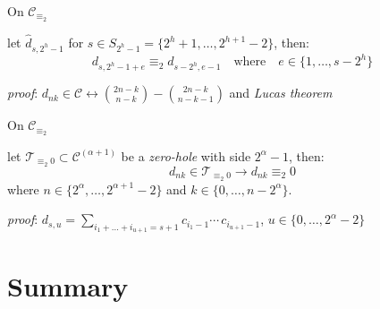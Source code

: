 \documentclass[10pt,serif, professionalfont]{beamer}
\begin{document}
\begin{frame}{On $\mathcal{C}_{\equiv_{2}}$}
    \begin{theorem}
    let $\hat{d}_{s,2^{h}-1}$ for $s\in S_{2^{h}-1}=\lbrace 2^{h}+1,\ldots,2^{h+1}-2 \rbrace$, then:
    \begin{displaymath}
        d_{s,2^{h}-1+e} \equiv_{2} d_{s-2^{h},e-1}\quad\text{where}\quad e\in\lbrace1,\ldots,s-2^{h}\rbrace
    \end{displaymath}
    \end{theorem}
    \emph{proof}: $ d_{nk}\in\mathcal{C}\leftrightarrow{{2n-k}\choose{n-k}} - {{2n-k}\choose{n-k-1}}$ and \emph{Lucas theorem}

    
        
\end{frame}

\begin{frame}{On $\mathcal{C}_{\equiv_{2}}$}
    \begin{theorem}
    let $\mathcal{T}_{\equiv_{2}0} \subset \mathcal{C}^{(\alpha+1)}$ be a %
    \emph{zero-hole} with side $2^{\alpha}-1$, then:
    \begin{displaymath}
        d_{nk}\in\mathcal{T}_{\equiv_{2}0}\rightarrow d_{nk}\equiv_{2}0
    \end{displaymath}
    where $n\in\lbrace2^{\alpha},\ldots,2^{\alpha+1}-2\rbrace$ and $k\in\lbrace0,\ldots,n-2^{\alpha}\rbrace$.
    \end{theorem}
    \emph{proof}: $d_{s, u} = \sum_{i_{1}+\ldots+i_{u+1}=s+1}
            {c_{i_{1}-1}\cdots\,c_{i_{u+1}-1}}$, $u\in\lbrace0,\ldots,2^{\alpha}-2\rbrace$

    
        
\end{frame}


\section*{Summary}
\end{document}
